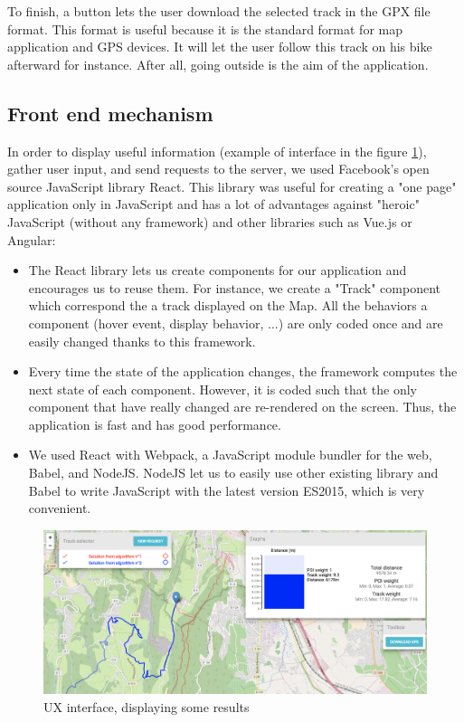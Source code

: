 \documentclass[sigconf]{acmart}
\begin{document}
To finish, a button lets the user download the selected track in the GPX file format. This format is useful because it is the standard format for map application and GPS devices. It will let the user follow this track on his bike afterward for instance. After all, going outside is the aim of the application.

\subsection{Front end mechanism}
In order to display useful information (example of interface in the figure \ref{figure:ux}), gather user input, and send requests to the server, we used Facebook's open source JavaScript library React. This library was useful for creating a "one page" application only in JavaScript and has a lot of advantages against "heroic" JavaScript (without any framework) and other libraries such as Vue.js or Angular:

\begin{itemize}
\item The React library lets us create components for our application and encourages us to reuse them. For instance, we create a "Track" component which correspond the a track displayed on the Map. All the behaviors a component (hover event, display behavior, ...) are only coded once and are easily changed thanks to this framework.
\item Every time the state of the application changes, the framework computes the next state of each component. However, it is coded such that the only component that have really changed are re-rendered on the screen. Thus, the application is fast and has good performance.
\item We used React with Webpack, a JavaScript module bundler for the web, Babel, and NodeJS. NodeJS let us to easily use other existing library and Babel to write JavaScript with the latest version ES2015, which is very convenient.
\end{itemize}

\begin{figure}
  \includegraphics[width=\textwidth]{ux.png}
  \caption{UX interface, displaying some results}
  \label{figure:ux}
\end{figure}
\end{document}
